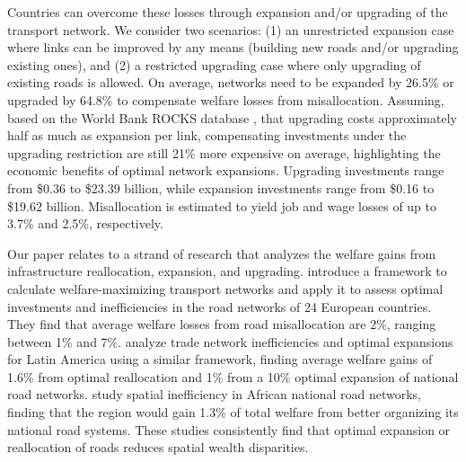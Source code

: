 \documentclass[a4paper]{article}
\begin{document}
Countries can overcome these losses through expansion and/or upgrading of the transport network. We consider two scenarios: (1) an unrestricted expansion case where links can be improved by any means (building new roads and/or upgrading existing ones), and (2) a restricted upgrading case where only upgrading of existing roads is allowed. On average, networks need to be expanded by 26.5\% or upgraded by 64.8\% to compensate welfare losses from misallocation. Assuming, based on the World Bank ROCKS database \citep{rocks2018}, that upgrading costs approximately half as much as expansion per link, compensating investments under the upgrading restriction are still 21\% more expensive on average, highlighting the economic benefits of optimal network expansions. Upgrading investments range from \$0.36 to \$23.39 billion, while expansion investments range from \$0.16 to \$19.62 billion. Misallocation is estimated to yield job and wage losses of up to 3.7\% and 2.5\%, respectively. \newline





Our paper relates to a strand of research that analyzes the welfare gains from infrastructure reallocation, expansion, and upgrading. \citet{fajgelbaum2020optimal} introduce a framework to calculate welfare-maximizing transport networks and apply it to assess optimal investments and inefficiencies in the road networks of 24 European countries. They find that average welfare losses from road misallocation are 2\%, ranging between 1\% and 7\%. \citet{gorton2022trade} analyze trade network inefficiencies and optimal expansions for Latin America using a similar framework, finding average welfare gains of 1.6\% from optimal reallocation and 1\% from a 10\% optimal expansion of national road networks. \citet{graff2024spatial} study spatial inefficiency in African national road networks, finding that the region would gain 1.3\% of total welfare from better organizing its national road systems. These studies consistently find that optimal expansion or reallocation of roads reduces spatial wealth disparities. \newline
\end{document}
